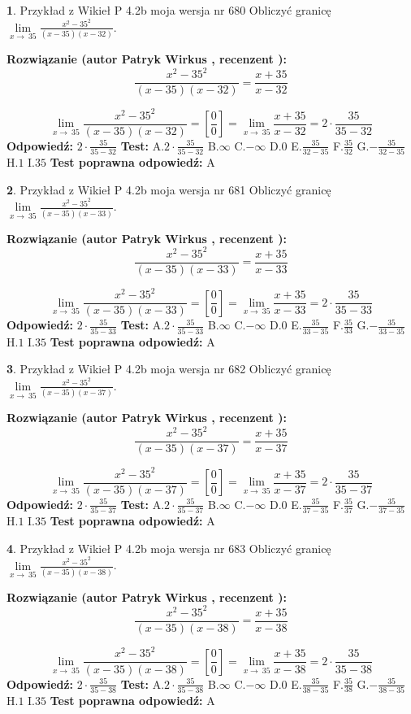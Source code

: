 \documentclass[12pt, a4paper]{article}
\theoremstyle{definition} %
\newtheorem{zad}{}
\newcommand{\zadStart}[1]{\begin{zad}#1\newline}
\newcommand{\zadStop}{\end{zad}}
\newcommand{\rozwStart}[2]{\noindent \textbf{Rozwiązanie (autor #1 , recenzent #2): }\newline}
\newcommand{\rozwStop}{\newline}
\newcommand{\odpStart}{\noindent \textbf{Odpowiedź:}\newline}
\newcommand{\odpStop}{\newline}
\newcommand{\testStart}{\noindent \textbf{Test:}\newline}
\newcommand{\testStop}{\newline}
\newcommand{\kluczStart}{\noindent \textbf{Test poprawna odpowiedź:}\newline}
\newcommand{\kluczStop}{\newline}
\begin{document}
\zadStart{Przykład z Wikieł P 4.2b moja wersja nr 680}
Obliczyć granicę $\lim\limits_{x\to\ 35}\frac{x^{2}-35^{2}}{(x-35)(x-32)}$.
\zadStop
\rozwStart{Patryk Wirkus}{}
$$\frac{x^{2}-35^{2}}{(x-35)(x-32)}=\frac{x+35}{x-32}$$

$$\lim\limits_{x\to\ 35}\frac{x^{2}-35^{2}}{(x-35)(x-32)}=[\frac{0}{0}]=\lim\limits_{x\to\ 35}\frac{x+35}{x-32}=2 \cdot \frac{35}{35-32}$$
\rozwStop
\odpStart
$2 \cdot \frac{35}{35-32}$
\odpStop
\testStart
A.$2 \cdot \frac{35}{35-32}$
B.$\infty$
C.$-\infty$
D.$0$
E.$\frac{35}{32-35}$
F.$\frac{35}{32}$
G.$-\frac{35}{32-35}$
H.$1$
I.$35$
\testStop
\kluczStart
A
\kluczStop



\zadStart{Przykład z Wikieł P 4.2b moja wersja nr 681}
Obliczyć granicę $\lim\limits_{x\to\ 35}\frac{x^{2}-35^{2}}{(x-35)(x-33)}$.
\zadStop
\rozwStart{Patryk Wirkus}{}
$$\frac{x^{2}-35^{2}}{(x-35)(x-33)}=\frac{x+35}{x-33}$$

$$\lim\limits_{x\to\ 35}\frac{x^{2}-35^{2}}{(x-35)(x-33)}=[\frac{0}{0}]=\lim\limits_{x\to\ 35}\frac{x+35}{x-33}=2 \cdot \frac{35}{35-33}$$
\rozwStop
\odpStart
$2 \cdot \frac{35}{35-33}$
\odpStop
\testStart
A.$2 \cdot \frac{35}{35-33}$
B.$\infty$
C.$-\infty$
D.$0$
E.$\frac{35}{33-35}$
F.$\frac{35}{33}$
G.$-\frac{35}{33-35}$
H.$1$
I.$35$
\testStop
\kluczStart
A
\kluczStop



\zadStart{Przykład z Wikieł P 4.2b moja wersja nr 682}
Obliczyć granicę $\lim\limits_{x\to\ 35}\frac{x^{2}-35^{2}}{(x-35)(x-37)}$.
\zadStop
\rozwStart{Patryk Wirkus}{}
$$\frac{x^{2}-35^{2}}{(x-35)(x-37)}=\frac{x+35}{x-37}$$

$$\lim\limits_{x\to\ 35}\frac{x^{2}-35^{2}}{(x-35)(x-37)}=[\frac{0}{0}]=\lim\limits_{x\to\ 35}\frac{x+35}{x-37}=2 \cdot \frac{35}{35-37}$$
\rozwStop
\odpStart
$2 \cdot \frac{35}{35-37}$
\odpStop
\testStart
A.$2 \cdot \frac{35}{35-37}$
B.$\infty$
C.$-\infty$
D.$0$
E.$\frac{35}{37-35}$
F.$\frac{35}{37}$
G.$-\frac{35}{37-35}$
H.$1$
I.$35$
\testStop
\kluczStart
A
\kluczStop



\zadStart{Przykład z Wikieł P 4.2b moja wersja nr 683}
Obliczyć granicę $\lim\limits_{x\to\ 35}\frac{x^{2}-35^{2}}{(x-35)(x-38)}$.
\zadStop
\rozwStart{Patryk Wirkus}{}
$$\frac{x^{2}-35^{2}}{(x-35)(x-38)}=\frac{x+35}{x-38}$$

$$\lim\limits_{x\to\ 35}\frac{x^{2}-35^{2}}{(x-35)(x-38)}=[\frac{0}{0}]=\lim\limits_{x\to\ 35}\frac{x+35}{x-38}=2 \cdot \frac{35}{35-38}$$
\rozwStop
\odpStart
$2 \cdot \frac{35}{35-38}$
\odpStop
\testStart
A.$2 \cdot \frac{35}{35-38}$
B.$\infty$
C.$-\infty$
D.$0$
E.$\frac{35}{38-35}$
F.$\frac{35}{38}$
G.$-\frac{35}{38-35}$
H.$1$
I.$35$
\testStop
\kluczStart
A
\kluczStop
\end{document}
